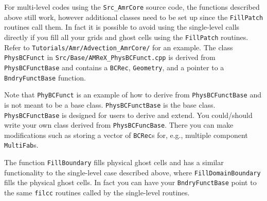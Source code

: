 For multi-level codes using the {\tt Src\_AmrCore} source code, the
functions described above still work, however additional classes need to
be set up since the {\tt FillPatch} routines call them.
In fact it is possible to avoid using the single-level calls directly if
you fill all your grids and ghost cells using the {\tt FillPatch} routines.
Refer to {\tt Tutorials/Amr/Advection\_AmrCore/} for an example.
The class {\tt PhysBCFunct} in {\tt Src/Base/AMReX\_PhysBCFunct.cpp}
is derived from {\tt PhysBCFunctBase} and contains a {\tt BCRec}, {\tt Geometry},
and a pointer to a {\tt BndryFunctBase} function.

Note that {\tt PhyBCFunct} is an example of how to derive from {\tt PhysBCFunctBase} and is
not meant to be a base class. {\tt PhysBCFunctBase} is the base class.
{\tt PhysBCFunctBase} is designed for users to derive and extend. 
You could/should write your own class derived from {\tt PhysBCFuncBase}.
There you can make modifications such as storing a vector of {\tt BCRec}s for, e.g.,
multiple component {\tt MultiFab}s.

The function {\tt FillBoundary} fills physical ghost cells and has a similar functionality
to the single-level case described above, where {\tt FillDomainBoundary}
fills the physical ghost cells.  In fact you can have your {\tt BndryFunctBase}
point to the same {\tt filcc} routines called by the single-level routines.
